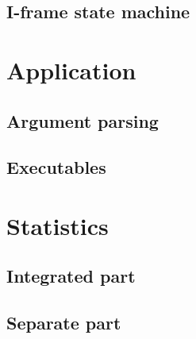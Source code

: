 \documentclass[a4paper, 11pt]{report}
\begin{document}
\subsection{I-frame state machine}



\section{Application}



\subsection{Argument parsing}



\subsection{Executables}



\section{Statistics}
\subsection{Integrated part}



\subsection{Separate part}



\end{document}
